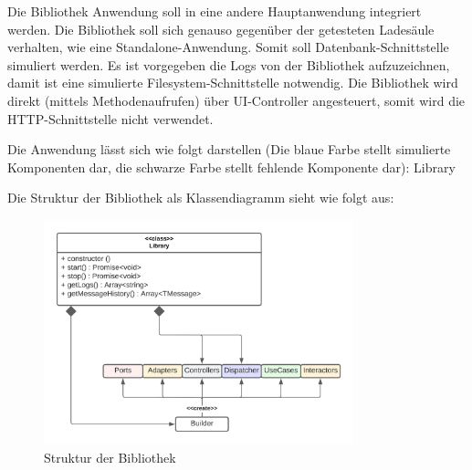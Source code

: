 Die Bibliothek Anwendung soll in eine andere Hauptanwendung integriert werden. 
Die Bibliothek soll sich genauso gegenüber der getesteten Ladesäule verhalten, wie eine Standalone-Anwendung. 
Somit soll Datenbank-Schnittstelle simuliert werden. 
Es ist vorgegeben die Logs von der Bibliothek aufzuzeichnen, damit ist eine simulierte Filesystem-Schnittstelle notwendig.
Die Bibliothek wird direkt (mittels Methodenaufrufen) über UI-Controller angesteuert, 
somit wird die HTTP-Schnittstelle nicht verwendet. 

Die Anwendung lässt sich wie folgt darstellen (Die blaue Farbe stellt simulierte Komponenten
dar, die schwarze Farbe stellt fehlende Komponente dar):
{Library}

\newpage
Die Struktur der Bibliothek als Klassendiagramm sieht wie folgt aus:

\begin{figure}[H]
    \centering
    \includegraphics[width=0.8\textwidth]{./images/LibraryKlassenDiagramm.png}
    \caption[Struktur der Bibliothek]{Struktur der Bibliothek}
    \label{fig:LibraryClassDiagramm}
\end{figure}
